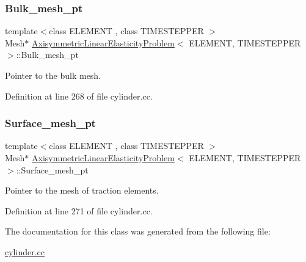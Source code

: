 \subsubsection{\texorpdfstring{Bulk\+\_\+mesh\+\_\+pt}{Bulk\_mesh\_pt}}
{\footnotesize\ttfamily template$<$class E\+L\+E\+M\+E\+NT , class T\+I\+M\+E\+S\+T\+E\+P\+P\+ER $>$ \\
Mesh$\ast$ \hyperlink{classAxisymmetricLinearElasticityProblem}{Axisymmetric\+Linear\+Elasticity\+Problem}$<$ E\+L\+E\+M\+E\+NT, T\+I\+M\+E\+S\+T\+E\+P\+P\+ER $>$\+::Bulk\+\_\+mesh\+\_\+pt\hspace{0.3cm}{\ttfamily [private]}}



Pointer to the bulk mesh. 



Definition at line 268 of file cylinder.\+cc.

\mbox{\label{classAxisymmetricLinearElasticityProblem_a62a8248651ee5b17b5168fe9158039dc}} 
\subsubsection{\texorpdfstring{Surface\+\_\+mesh\+\_\+pt}{Surface\_mesh\_pt}}
{\footnotesize\ttfamily template$<$class E\+L\+E\+M\+E\+NT , class T\+I\+M\+E\+S\+T\+E\+P\+P\+ER $>$ \\
Mesh$\ast$ \hyperlink{classAxisymmetricLinearElasticityProblem}{Axisymmetric\+Linear\+Elasticity\+Problem}$<$ E\+L\+E\+M\+E\+NT, T\+I\+M\+E\+S\+T\+E\+P\+P\+ER $>$\+::Surface\+\_\+mesh\+\_\+pt\hspace{0.3cm}{\ttfamily [private]}}



Pointer to the mesh of traction elements. 



Definition at line 271 of file cylinder.\+cc.



The documentation for this class was generated from the following file\+:\begin{DoxyCompactItemize}
\item 
\hyperlink{cylinder_8cc}{cylinder.\+cc}\end{DoxyCompactItemize}
